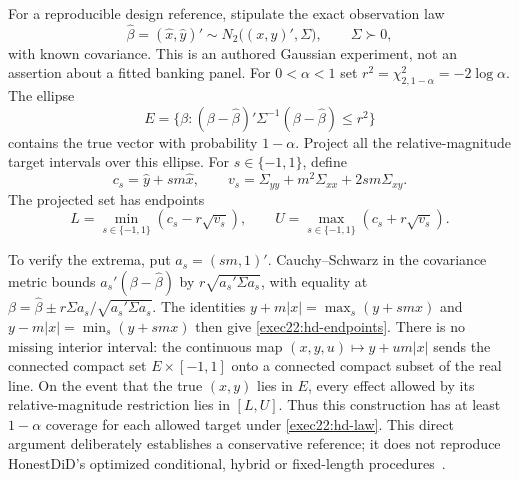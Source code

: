 For a reproducible design reference, stipulate the exact observation law
\begin{equation}
 \widehat\beta=(\widehat x,\widehat y)'\sim
 N_2\bigl((x,y)',\Sigma\bigr),\qquad \Sigma\succ0,
 \label{exec22:hd-law}
\end{equation}
with known covariance. This is an authored Gaussian experiment, not an
assertion about a fitted banking panel. For $0<\alpha<1$ set
$r^2=\chi^2_{2,1-\alpha}=-2\log\alpha$. The ellipse
\begin{equation}
 E=\{\beta:(\beta-\widehat\beta)'\Sigma^{-1}
                  (\beta-\widehat\beta)\leq r^2\}
 \label{exec22:hd-ellipse}
\end{equation}
contains the true vector with probability $1-\alpha$. Project all the
relative-magnitude target intervals over this ellipse. For $s\in\{-1,1\}$,
define
\begin{equation}
 c_s=\widehat y+sm\widehat x,\qquad
 v_s=\Sigma_{yy}+m^2\Sigma_{xx}+2sm\Sigma_{xy}.
 \label{exec22:hd-components}
\end{equation}
The projected set has endpoints
\begin{equation}
 L=\min_{s\in\{-1,1\}}(c_s-r\sqrt{v_s}),\qquad
 U=\max_{s\in\{-1,1\}}(c_s+r\sqrt{v_s}).
 \label{exec22:hd-endpoints}
\end{equation}

To verify the extrema, put $a_s=(sm,1)'$. Cauchy--Schwarz in the covariance
metric bounds $a_s'(\beta-\widehat\beta)$ by
$r\sqrt{a_s'\Sigma a_s}$, with equality at
$\beta=\widehat\beta\pm r\Sigma a_s/\sqrt{a_s'\Sigma a_s}$.
The identities $y+m|x|=\max_s(y+smx)$ and
$y-m|x|=\min_s(y+smx)$ then give
\eqref{exec22:hd-endpoints}. There is no missing interior interval:
the continuous map $(x,y,u)\mapsto y+um|x|$ sends the connected compact set
$E\times[-1,1]$ onto a connected compact subset of the real line.
On the event that the true $(x,y)$ lies in $E$, every effect allowed by its
relative-magnitude restriction lies in $[L,U]$. Thus this construction has
at least $1-\alpha$ coverage for each allowed target under
\eqref{exec22:hd-law}. This direct argument deliberately establishes a
conservative reference; it does not reproduce HonestDiD's optimized conditional,
hybrid or fixed-length procedures~\citep{exec22_honestdid_reference}.

